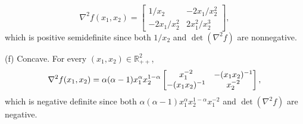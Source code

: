 \begin{solution}
\[      \nabla^2f(x_1,x_2) = \begin{bmatrix}
        1/x_2 & -2x_1/x_2^2 \\ -2x_1/x_2^2 & 2x_1^2/x_2^3
      \end{bmatrix},
    \]
    which is positive semidefinite since both $1/x_2$ and $\det(\nabla^2 f)$ are
    nonnegative. \par
    (f) Concave. For every $(x_1,x_2)\in\mathbb{R}_{++}^2$,
    \[
      \nabla^2f(x_1,x_2) = \alpha(\alpha-1)x_1^\alpha x_2^{1-\alpha}
      \begin{bmatrix}
        x_1^{-2} & -(x_1x_2)^{-1} \\ -(x_1x_2)^{-1} & x_2^{-2}
      \end{bmatrix},
    \]
    which is negative definite since both $\alpha(\alpha-1)x_1^\alpha
    x_2^{1-\alpha}x_1^{-2}$ and $\det(\nabla^2 f)$ are negative.
  \end{solution}
